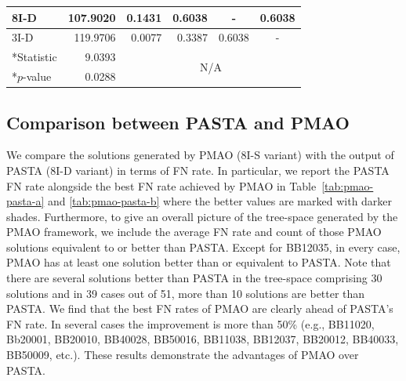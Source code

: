\begin{table}[!htbp]
\begin{tabular}{|l|r||c|c|c|c|}
		\hline
		8I-D & 107.9020 & \multicolumn{1}{r|}{0.1431} & \multicolumn{1}{r|}{0.6038} & \multicolumn{1}{c|}{-} & \multicolumn{1}{r|}{0.6038} \\
		\hline
		3I-D & 119.9706 & \multicolumn{1}{r|}{\cellcolor[rgb]{ .384,  .745,  .478}0.0077} & \multicolumn{1}{r|}{0.3387} & \multicolumn{1}{r|}{0.6038} & - \\
		\hline
		*Statistic & 9.0393 & \multicolumn{4}{c|}{\multirow{2}{*}{N/A}} \\
		\cline{1-2}    *$p$-value & 0.0288 & \multicolumn{4}{c|}{} \\
		\hline
	\end{tabular}\label{tab:test-pmao-variants}\end{table}

\subsection{Comparison between PASTA and PMAO}
We compare the solutions generated by PMAO (8I-S variant) with the output of PASTA (8I-D variant) in terms of FN rate. In particular, we report the PASTA FN rate alongside the best FN rate achieved by PMAO in Table~\ref{tab:pmao-pasta-a} and \ref{tab:pmao-pasta-b} where the better values are marked with darker shades. Furthermore, to give an overall picture of the tree-space generated by the PMAO framework, we include the average FN rate and count of those PMAO solutions equivalent to or better than PASTA. Except for BB12035, in every case, PMAO has at least one solution better than or equivalent to PASTA. Note that there are several solutions better than PASTA in the tree-space comprising 30 solutions and in 39 cases out of 51, more than 10 solutions are better than PASTA. We find that the best FN rates of PMAO are clearly ahead of PASTA's FN rate. In several cases the improvement is more than 50\% (e.g., BB11020, Bb20001, BB20010, BB40028, BB50016, BB11038, BB12037, BB20012, BB40033, BB50009, etc.). These results demonstrate the advantages of PMAO over PASTA.

